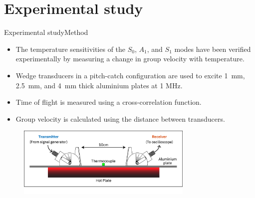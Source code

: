 \documentclass[aspectratio=169, 9pt]{beamer}
\begin{document}

\section{Experimental study}
\begin{frame}{Experimental study}{Method}

\begin{itemize}
  \item The temperature sensitivities of the $S_0$, $A_1$, and $S_1$ modes have been verified experimentally by measuring a change in group velocity with temperature.
  \item Wedge transducers in a pitch-catch configuration are used to excite 1~mm, 2.5~mm, and 4~mm thick aluminium plates at 1 MHz.
  \item Time of flight is measured using a cross-correlation function.
  \item Group velocity is calculated using the distance between transducers.
\end{itemize}

  \begin{figure}[h]
    \centering
    \includegraphics[width=0.75\textwidth]{images/testdiagramsimple.eps}
    \end{figure}
\end{frame}

\end{document}

